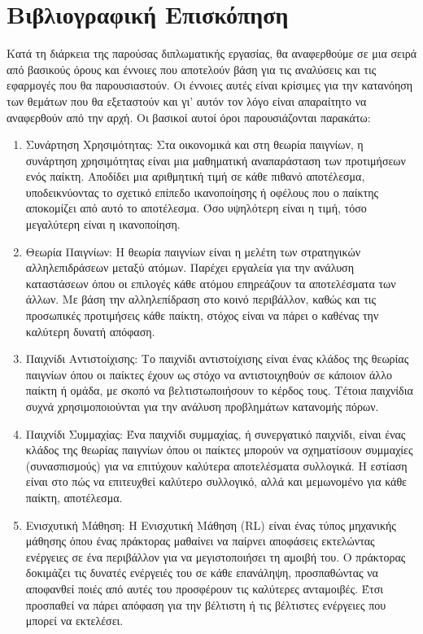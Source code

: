 \section{Βιβλιογραφική Επισκόπηση}

Κατά τη διάρκεια της παρούσας διπλωματικής εργασίας, θα αναφερθούμε σε μια σειρά από βασικούς όρους και έννοιες που αποτελούν βάση για τις αναλύσεις και τις εφαρμογές που θα παρουσιαστούν. Οι έννοιες αυτές είναι κρίσιμες για την κατανόηση των θεμάτων που θα εξεταστούν και γι' αυτόν τον λόγο είναι απαραίτητο να αναφερθούν από την αρχή. Οι βασικοί αυτοί όροι παρουσιάζονται παρακάτω:

\begin{enumerate}
    \item Συνάρτηση Χρησιμότητας: Στα οικονομικά και στη θεωρία παιγνίων, η συνάρτηση χρησιμότητας είναι μια μαθηματική αναπαράσταση των προτιμήσεων ενός παίκτη. Αποδίδει μια αριθμητική τιμή σε κάθε πιθανό αποτέλεσμα, υποδεικνύοντας το σχετικό επίπεδο ικανοποίησης ή οφέλους που ο παίκτης αποκομίζει από αυτό το αποτέλεσμα. Όσο υψηλότερη είναι η τιμή, τόσο μεγαλύτερη είναι η ικανοποίηση. 

    \item Θεωρία Παιγνίων: Η θεωρία παιγνίων είναι η μελέτη των στρατηγικών αλληλεπιδράσεων μεταξύ ατόμων. Παρέχει εργαλεία για την ανάλυση καταστάσεων όπου οι επιλογές κάθε ατόμου επηρεάζουν τα αποτελέσματα των άλλων. Με βάση την αλληλεπίδραση στο κοινό περιβάλλον, καθώς και τις προσωπικές προτιμήσεις κάθε παίκτη, στόχος είναι να πάρει ο καθένας την καλύτερη δυνατή απόφαση. 

    \item Παιχνίδι Αντιστοίχισης: Το παιχνίδι αντιστοίχισης είναι ένας κλάδος της θεωρίας παιγνίων όπου οι παίκτες έχουν ως στόχο να αντιστοιχηθούν σε κάποιον άλλο παίκτη ή ομάδα, με σκοπό να βελτιστωποιήσουν το κέρδος τους. Τέτοια παιχνίδια συχνά χρησιμοποιούνται για την ανάλυση προβλημάτων κατανομής πόρων. 

    \item Παιχνίδι Συμμαχίας: Ένα παιχνίδι συμμαχίας, ή συνεργατικό παιχνίδι, είναι ένας κλάδος της θεωρίας παιγνίων όπου οι παίκτες μπορούν να σχηματίσουν συμμαχίες (συνασπισμούς) για να επιτύχουν καλύτερα αποτελέσματα συλλογικά. Η εστίαση είναι στο πώς να επιτευχθεί καλύτερο συλλογικό, αλλά και μεμωνομένο για κάθε παίκτη, αποτέλεσμα. 

    \item Ενισχυτική Μάθηση: Η Ενισχυτική Μάθηση (RL) είναι ένας τύπος μηχανικής μάθησης όπου ένας πράκτορας μαθαίνει να παίρνει αποφάσεις εκτελώντας ενέργειες σε ένα περιβάλλον για να μεγιστοποιήσει τη αμοιβή του. Ο πράκτορας δοκιμάζει τις δυνατές ενέργειές του σε κάθε επανάληψη, προσπαθώντας να αποφανθεί ποιές από αυτές του προσφέρουν τις καλύτερες ανταμοιβές. Έτσι προσπαθεί να πάρει απόφαση για την βέλτιστη ή τις βέλτιστες ενέργειες που μπορεί να εκτελέσει. 


\end{enumerate}
